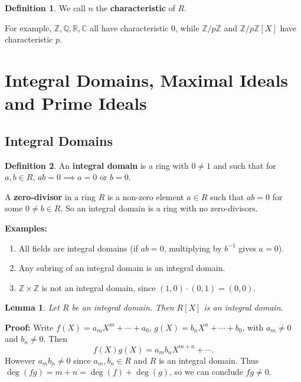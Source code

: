 \documentclass[12pt]{article}
\newtheorem{lemma}{Lemma}[section]
\theoremstyle{definition}
\newtheorem{definition}{Definition}[section]
\theoremstyle{remark}
\begin{document}
\begin{definition}
	We call $n$ the \textbf{characteristic} of $R$.
\end{definition}

For example, $\mathbb{Z}, \mathbb{Q}, \mathbb{R}, \mathbb{C}$ all have characteristic 0, while $\mathbb{Z}/p \mathbb{Z}$ and $\mathbb{Z}/p \mathbb{Z}[X]$ have characteristic $p$.

\newpage

\section[Integral Domains and Ideals]{Integral Domains, Maximal Ideals and Prime Ideals}%
\label{sec:integral_domains_maximal_ideals_and_prime_ideals}

\subsection{Integral Domains}%
\label{sub:integral_domains}

\begin{definition}
	An \textbf{integral domain} is a ring with $0 \neq 1$ and such that for $a, b \in R$, $ab = 0 \implies a = 0$ or $b = 0$.
\end{definition}

A \textbf{zero-divisor} in a ring $R$ is a non-zero element $a \in R$ such that $ab = 0$ for some $0 \neq b \in R$. So an integral domain is a ring with no zero-divisors.

\textbf{Examples:}
\begin{enumerate}[label= (\roman*)]
	\item All fields are integral domains (if $ab = 0$, multiplying by $b^{-1}$ gives $a = 0$).
	\item Any subring of an integral domain is an integral domain.
	\item $\mathbb{Z} \times \mathbb{Z}$ is not an integral domain, since $(1, 0) \cdot (0, 1) = (0, 0)$.
\end{enumerate}

\begin{lemma}
	Let $R$ be an integral domain. Then $R[X]$ is an integral domain.
\end{lemma}

\begin{adjustbox}{minipage = \columnwidth - 25.5pt, margin=1em, frame=1pt, margin=0em}
	\textbf{Proof:} Write $f(X) = a_mX^{m} + \cdots + a_0$, $g(X) = b_nX^{n} + \cdots + b_0$, with $a_m \neq 0$ and $b_n \neq 0$. Then
	\[
		f(X)g(X) = a_mb_nX^{m + n} + \cdots
	.\]
	However $a_mb_n \neq 0$ since $a_m, b_n \in R$ and $R$ is an integral domain. Thus $\deg(fg) = m + n = \deg(f) + \deg(g)$, so we can conclude $fg \neq 0$.
\end{adjustbox}
\end{document}
